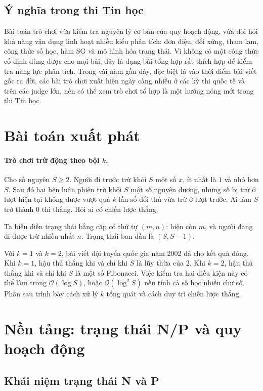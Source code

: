 \documentclass[11pt]{article}
\newcommand{\Oh}{\mathcal{O}}
\begin{document}
\subsection{Ý nghĩa trong thi Tin học}

Bài toán trò chơi vừa kiểm tra nguyên lý cơ bản của quy hoạch động, vừa đòi hỏi
khả năng vận dụng linh hoạt nhiều kiểu phân tích: đơn điệu, đối xứng, tham lam,
công thức số học, hàm SG và mô hình hóa trạng thái. Vì không có một công thức
cố định dùng được cho mọi bài, đây là dạng bài tổng hợp rất thích hợp để kiểm
tra năng lực phân tích. Trong vài năm gần đây, đặc biệt là vào thời điểm bài
viết gốc ra đời, các bài trò chơi xuất hiện ngày càng nhiều ở các kỳ thi quốc
tế và trên các judge lớn, nên có thể xem trò chơi tổ hợp là một hướng nóng mới
trong thi Tin học.

\section{Bài toán xuất phát}

\paragraph{Trò chơi trừ động theo bội \(k\).}
Cho số nguyên \(S\ge 2\). Người đi trước trừ khỏi \(S\) một số \(x\), ít nhất
là \(1\) và nhỏ hơn \(S\). Sau đó hai bên luân phiên trừ khỏi \(S\) một số
nguyên dương, nhưng số bị trừ ở lượt hiện tại không được vượt quá \(k\) lần số
đối thủ vừa trừ ở lượt trước. Ai làm \(S\) trở thành \(0\) thì thắng. Hỏi ai
có chiến lược thắng.

Ta biểu diễn trạng thái bằng cặp có thứ tự \((m,n)\): hiện còn \(m\), và người
đang đi được trừ nhiều nhất \(n\). Trạng thái ban đầu là \((S,S-1)\).

Với \(k=1\) và \(k=2\), bài viết đội tuyển quốc gia năm 2002 đã cho kết quả
đóng. Khi \(k=1\), hậu thủ thắng khi và chỉ khi \(S\) là lũy thừa của \(2\).
Khi \(k=2\), hậu thủ thắng khi và chỉ khi \(S\) là một số Fibonacci. Việc kiểm
tra hai điều kiện này có thể làm trong \(\Oh(\log S)\), hoặc
\(\Oh(\log^2 S)\) nếu tính cả số học nhiều chữ số. Phần sau trình bày cách xử
lý \(k\) tổng quát và cách duy trì chiến lược thắng.

\section{Nền tảng: trạng thái N/P và quy hoạch động}

\subsection{Khái niệm trạng thái N và P}
\end{document}
